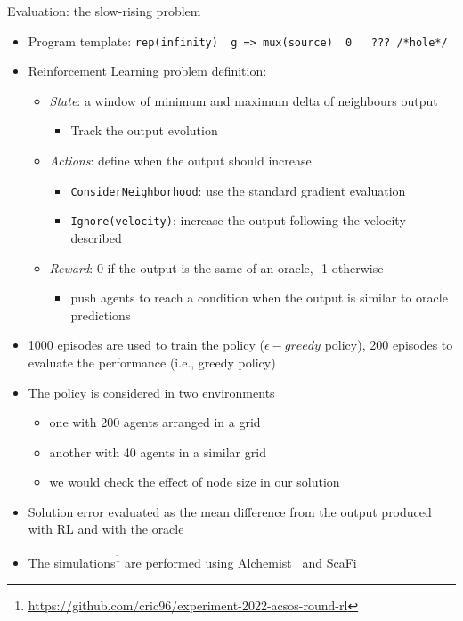\documentclass[8pt, aspectratio=169, handout]{beamer}
\begin{document}
\begin{frame}{Evaluation: the slow-rising problem}
\begin{card}
\begin{itemize}
      \item Program template: \texttt{rep(infinity) { g => mux(source) { 0 } { ??? /*hole*/ } }}
      \item Reinforcement Learning problem definition:
      \begin{itemize}
        \item \emph{State}: a window of minimum and maximum delta of neighbours output
        \begin{itemize}
          \item[\faArrowRight] Track the output evolution
        \end{itemize}
        \item \emph{Actions}: define when the output should increase
        \begin{itemize}
          \item[\faArrowRight] \texttt{ConsiderNeighborhood}: use the standard gradient evaluation
          \item[\faArrowRight] \texttt{Ignore(velocity)}: increase the output following the velocity described
        \end{itemize}
        \item \emph{Reward}: 0 if the output is the same of an oracle, -1 otherwise
        \begin{itemize}
          \item[\faArrowRight] push agents to reach a condition when the output is similar to oracle predictions
        \end{itemize}
      \end{itemize}
    \end{itemize}
  \end{card}
\framebreak
  \begin{card}
    \begin{itemize}
      \item 1000 episodes are used to train the policy ($\epsilon-greedy$ policy), 200 episodes to evaluate the performance (i.e., greedy policy)
      \item The policy is considered in two environments 
      \begin{itemize}
        \item one with 200 agents arranged in a grid
        \item another with 40 agents in a similar grid
        \item we would check the effect of node size in our solution
      \end{itemize}
      \item Solution error evaluated as the mean difference from the output produced with RL and with the oracle
      \item The simulations\footnote{\url{https://github.com/cric96/experiment-2022-acsos-round-rl}} are performed using Alchemist~\cite{alchemist-jos2013} and ScaFi~\cite{DBLP:conf/isola/CasadeiVAD20} 
      

\end{itemize}
\end{card}
\end{frame}
\end{document}
